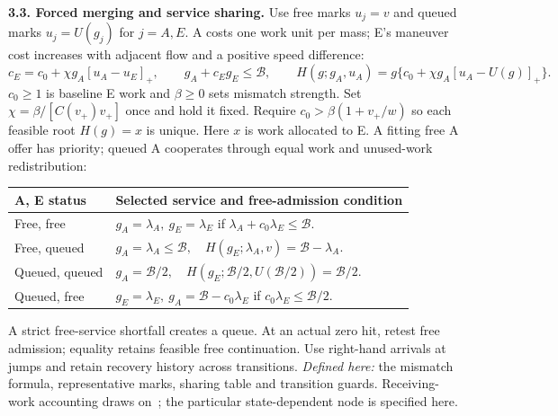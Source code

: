 \documentclass[10pt,a4paper]{article}
\newcommand{\pos}[1]{[#1]_+}
\newcommand{\bud}{\mathcal B}
\begin{document}
\newpage
\textbf{3.3. Forced merging and service sharing.}
Use free marks $u_j=v$ and queued marks $u_j=U(g_j)$ for $j=A,E$.
A costs one work unit per mass; E's maneuver cost increases with adjacent
flow and a positive speed difference:
\begin{equation}
 c_E=c_0+\chi g_A\pos{u_A-u_E},\qquad
 g_A+c_Eg_E\leq\bud,\qquad
 H(g;g_A,u_A)=g\{c_0+\chi g_A\pos{u_A-U(g)}\}.
 \label{eq:work}
\end{equation}
$c_0\geq1$ is baseline E work and $\beta\geq0$ sets mismatch strength.
Set $\chi=\beta/[C(v_+)v_+]$ once and hold it fixed.
Require $c_0>\beta(1+v_+/w)$ so each feasible root $H(g)=x$
is unique. Here $x$ is work allocated to E. A fitting free A offer has
priority; queued A cooperates through equal work and unused-work redistribution:
\begin{center}
\setlength{\tabcolsep}{5pt}
\begin{tabular}{@{}ll@{}}
\toprule
A, E status & Selected service and free-admission condition\\
\midrule
Free, free & $g_A=\lambda_A,\ g_E=\lambda_E$ if
$\lambda_A+c_0\lambda_E\leq\bud$.\\
Free, queued & $g_A=\lambda_A\leq\bud,\quad
H(g_E;\lambda_A,v)=\bud-\lambda_A$.\\
Queued, queued & $g_A=\bud/2,\quad
H(g_E;\bud/2,U(\bud/2))=\bud/2$.\\
Queued, free & $g_E=\lambda_E,\ g_A=\bud-c_0\lambda_E$ if
$c_0\lambda_E\leq\bud/2$.\\
\bottomrule
\end{tabular}
\end{center}
A strict free-service shortfall creates a queue. At an actual zero hit,
retest free admission; equality retains feasible free continuation. Use
right-hand arrivals at jumps and retain recovery history across transitions.
\emph{Defined here:} the mismatch formula, representative marks, sharing
table and transition guards. Receiving-work accounting draws on~\cite{carey};
the particular state-dependent node is specified here.
\end{document}
